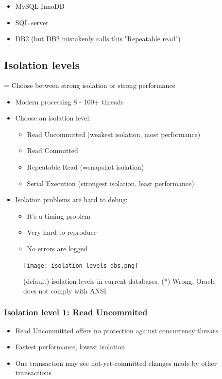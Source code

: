 \documentclass{article}
\begin{document}
\begin{itemize}
    \item MySQL InnoDB
    \item SQL server
    \item DB2 (but DB2 mistakenly calls this "Repeatable read")
\end{itemize}

\subsection{Isolation levels}

= Choose between strong isolation or strong performance

\begin{itemize}
    \item Modern processing 8 - 100+ threads
    \item Choose an isolation level:
    \begin{itemize}
        \item Read Uncommitted (weakest isolation, most performance)
        \item Read Committed
        \item Repeatable Read (=snapshot isolation)
        \item Serial Execution (strongest isolation, least performance)
    \end{itemize}
    \item Isolation problems are hard to debug:
    \begin{itemize}
        \item It's a timing problem
        \item Very hard to reproduce
        \item No errors are logged
    \end{itemize}
\end{itemize}

\begin{figure}[H]
    \centering
    \texttt{[image: isolation-levels-dbs.png]}
    \caption{(default) isolation levels in current databases. (*) Wrong, Oracle does not comply with ANSI}
\end{figure}


\subsubsection{Isolation level 1: Read Uncommited}

\begin{itemize}
    \item Read Uncommitted offers no protection against concurrency threats
    \item Fastest performance, lowest isolation
    \item One transaction may see not-yet-committed changes made by other transactions
\end{itemize}
\end{document}
